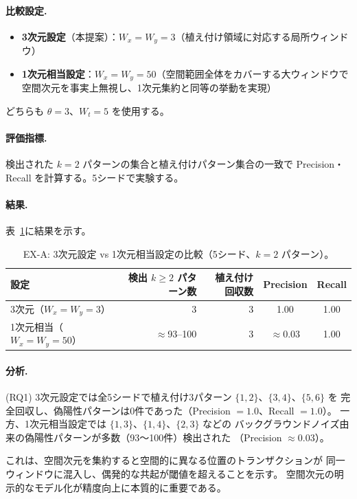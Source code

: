 \paragraph{比較設定.}
\begin{itemize}
\item \textbf{3次元設定}（本提案）：$W_x = W_y = 3$（植え付け領域に対応する局所ウィンドウ）
\item \textbf{1次元相当設定}：$W_x = W_y = 50$（空間範囲全体をカバーする大ウィンドウで
  空間次元を事実上無視し、1次元集約と同等の挙動を実現）
\end{itemize}
どちらも $\theta = 3$、$W_t = 5$ を使用する。

\paragraph{評価指標.}
検出された $k=2$ パターンの集合と植え付けパターン集合の一致で
Precision・Recall を計算する。5シードで実験する。

\paragraph{結果.}
表~\ref{tab:ex_a}に結果を示す。

\begin{table}[t]
\centering
\caption{EX-A: 3次元設定 vs 1次元相当設定の比較（5シード、$k=2$ パターン）。}
\label{tab:ex_a}
\small
\begin{tabular}{lrrcc}
\toprule
設定 & 検出 $k{\geq}2$ パターン数 & 植え付け回収数 & Precision & Recall \\
\midrule
3次元（$W_x{=}W_y{=}3$）     & 3   & 3 & 1.00 & 1.00 \\
1次元相当（$W_x{=}W_y{=}50$）& $\approx$93--100 & 3 & $\approx$0.03 & 1.00 \\
\bottomrule
\end{tabular}
\end{table}

\paragraph{分析.}
(RQ1)
3次元設定では全5シードで植え付け3パターン $\{1,2\}$、$\{3,4\}$、$\{5,6\}$ を
完全回収し、偽陽性パターンは0件であった（Precision $= 1.0$、Recall $= 1.0$）。
一方、1次元相当設定では $\{1,3\}$、$\{1,4\}$、$\{2,3\}$ などの
バックグラウンドノイズ由来の偽陽性パターンが多数（93〜100件）検出された
（Precision $\approx 0.03$）。

これは、空間次元を集約すると空間的に異なる位置のトランザクションが
同一ウィンドウに混入し、偶発的な共起が閾値を超えることを示す。
空間次元の明示的なモデル化が精度向上に本質的に重要である。

